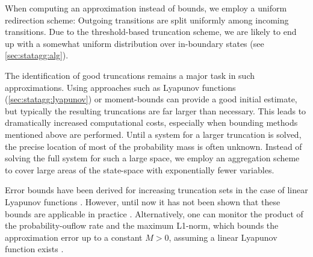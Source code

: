 When computing an approximation instead of bounds, we employ a uniform redirection scheme:
Outgoing transitions are split uniformly among incoming transitions.
Due to the threshold-based truncation scheme, we are likely to end up with a somewhat uniform distribution over in-boundary states (see \autoref{sec:statagg:alg}).


The identification of good truncations remains a major task in such approximations.
Using approaches such as Lyapunov functions (\autoref{sec:statagg:lyapunov}) \parencite{dayar2011bounding} or moment-bounds \parencite{kuntz2021approximations} can provide a good initial estimate, but typically the resulting truncations are far larger than necessary.
This leads to dramatically increased computational costs, especially when bounding methods mentioned above are performed.
Until a system for a larger truncation is solved, the precise location of  most of the probability mass is often unknown.
Instead of solving the full system for such a large space, we employ an aggregation scheme to cover large areas of the state-space with exponentially fewer variables.

Error bounds have been derived for increasing  truncation sets 
in the case of linear Lyapunov functions  \parencite{gupta2017finite}.
However, until now it has not been shown that these bounds are applicable in practice \parencite{meyn1994computable}.
Alternatively, one can monitor the product of the probability-ouflow rate and the maximum L1-norm, which bounds the approximation error up to a constant $M>0$, assuming a linear Lyapunov function exists \parencite{gupta2017finite}.


